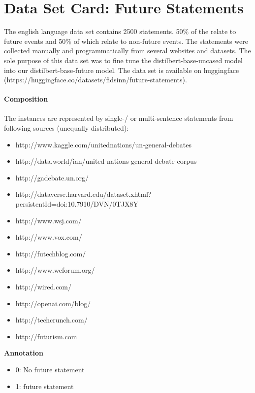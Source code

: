 \section{Data Set Card: Future Statements}
The english language data set contains 2500 statements. 
50\% of the relate to future events and 50\% of which relate to non-future events. 
The statements were collected manually and programmatically from several websites and datasets. 
The sole purpose of this data set was to fine tune the distilbert-base-uncased model into our distilbert-base-future model.
The data set is available on huggingface (https://huggingface.co/datasets/fidsinn/future-statements).
\\
\\
\textbf{Composition}
\\
\\
The instances are represented by single-/ or multi-sentence statements from following sources (unequally distributed):
%
\begin{itemize}
    \item http://www.kaggle.com/unitednations/un-general-debates
    \item http://data.world/ian/united-nations-general-debate-corpus
    \item http://gadebate.un.org/
    \item http://dataverse.harvard.edu/dataset.xhtml?persistentId=doi:10.7910/DVN/0TJX8Y
    \item http://www.wsj.com/
    \item http://www.vox.com/
    \item http://futechblog.com/
    \item http://www.weforum.org/
    \item http://wired.com/
    \item http://openai.com/blog/
    \item http://techcrunch.com/
    \item http://futurism.com
\end{itemize}
%
\textbf{Annotation}
\begin{itemize}
    \item 0: No future statement
    \item 1: future statement
\end{itemize}%